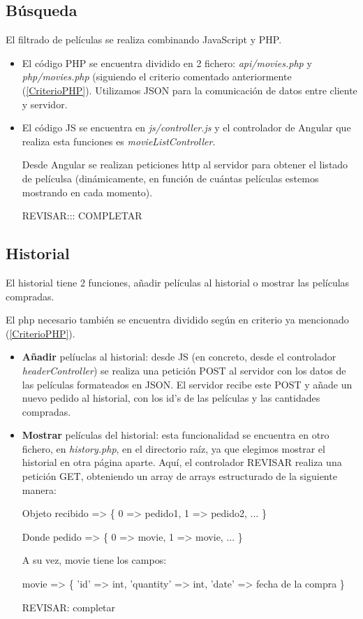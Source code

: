\documentclass{apuntes}
\begin{document}
\subsection{Búsqueda}
El filtrado de películas se realiza combinando JavaScript y PHP. 

\begin{itemize}
\item El código PHP se encuentra dividido en 2 fichero: \textit{api/movies.php} y \textit{php/movies.php} (siguiendo el criterio comentado anteriormente (\ref{CriterioPHP}). Utilizamos JSON para la comunicación de datos entre cliente y servidor.

\item El código JS se encuentra en \textit{js/controller.js} y el controlador de Angular que realiza esta funciones es \textit{movieListController}.

Desde Angular se realizan peticiones http al servidor para obtener el listado de películsa (dinámicamente, en función de cuántas películas estemos mostrando en cada momento). 

REVISAR::: COMPLETAR

\end{itemize}



\subsection{Historial}

El historial tiene 2 funciones, añadir películas al historial o mostrar las películas compradas. 

El php necesario también se encuentra dividido según en criterio ya mencionado (\ref{CriterioPHP}).

\begin{itemize}
\item \textbf{Añadir} pelíuclas al historial: desde JS (en concreto, desde el controlador \textit{headerController}) se realiza una petición POST al servidor con los datos de las películas formateados en JSON. El servidor recibe este POST y añade un nuevo pedido al historial, con los id's de las películas y las cantidades compradas. 

\item \textbf{Mostrar} películas del historial: esta funcionalidad se encuentra en otro fichero, en \textit{history.php}, en el directorio raíz, ya que elegimos mostrar el historial en otra página aparte. Aquí, el controlador REVISAR realiza una petición GET, obteniendo un array de arrays estructurado de la siguiente manera:

Objeto recibido => \{
		0 => pedido1,
		1 => pedido2,
		...
	\}
	
Donde pedido => \{
	0 => movie,
	1 => movie,
	...
\}

A su vez, movie tiene los campos:

movie => \{
	'id' => int,
	'quantity' => int,
	'date' => fecha de la compra
\}

REVISAR: completar

\end{itemize}
\end{document}
